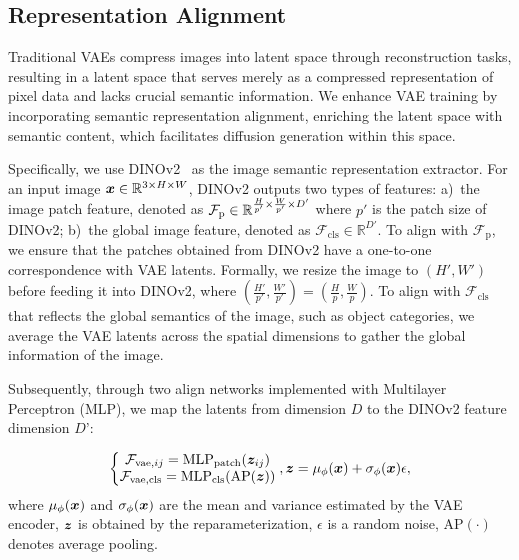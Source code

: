
\subsection{Representation Alignment}

Traditional VAEs compress images into latent space through reconstruction tasks, resulting in a latent space that serves merely as a compressed representation of pixel data and lacks crucial semantic information. We enhance VAE training by incorporating semantic representation alignment, enriching the latent space with semantic content, which facilitates diffusion generation within this space.

Specifically, we use DINOv2~\cite{oquab2023dinov2} as the image semantic representation extractor. For an input image \( {\bm{x}} \in {\mathbb{R}}^{3 \times H \times W}\), DINOv2 outputs two types of features: a)~the image patch feature, denoted as \(\mathcal{F}_\text{p} \in {\mathbb{R}}^{\frac{H}{p'} \times \frac{W}{p'} \times D'}\) where \(p'\) is the patch size of DINOv2; b)~the global image feature, denoted as \( \mathcal{F}_{\text{cls}} \in \mathbb{R}^{D'}\).
To align with \(\mathcal{F}_\text{p}\), we ensure that the patches obtained from DINOv2 have a one-to-one correspondence with VAE latents. Formally, we resize the image to \((H', W')\) before feeding it into DINOv2, where \((\frac{H'}{p'}, \frac{W'}{p'}) = (\frac{H}{p}, \frac{W}{p})\).
To align with \(\mathcal F_{\text{cls}}\) that reflects the global semantics of the image, such as object categories, we average the VAE latents across the spatial dimensions to gather the global information of the image.

Subsequently, through two align networks implemented with Multilayer Perceptron (MLP), we map the latents from dimension $D$ to the DINOv2 feature dimension $D’$:

\vspace{-0.5cm}
\begin{equation}
\left\{\begin{matrix}
\mathcal F_{\text{vae},ij}=\text{MLP}_{\text{patch}}({\bm{z}}_{ij})    \\
\mathcal F_{\text{vae},\text{cls}}=\text{MLP}_{\text{cls}}(\text{AP}({\bm{z}}))
\end{matrix}\right. ,
{\bm{z}} = \mu_\phi({\bm{x}})+\sigma_\phi({\bm{x}})\epsilon,
\label{equ:alignnet}
\end{equation}
where \(\mu_\phi({\bm{x}})\) and \(\sigma_\phi({\bm{x}})\) are the mean and variance estimated by the VAE encoder, \({\bm{z}}\) is obtained by the reparameterization, \(\epsilon\) is a random noise, $\text{AP}(\cdot)$ denotes average pooling.


